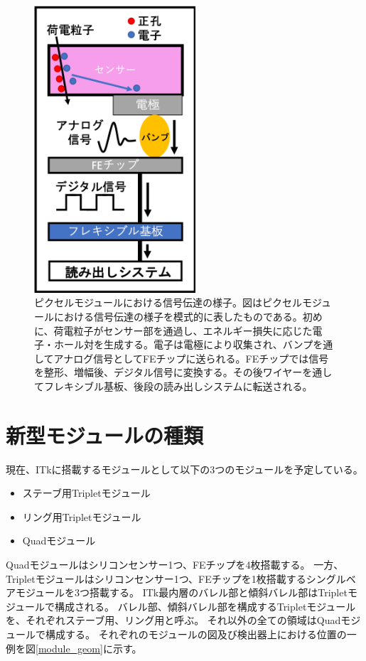 \begin{figure}[bpt]\centering
\includegraphics[width=6cm]{./module_electric_overview.png}
\caption[ピクセルモジュールにおける信号伝達の様子]{ピクセルモジュールにおける信号伝達の様子。図はピクセルモジュールにおける信号伝達の様子を模式的に表したものである。初めに、荷電粒子がセンサー部を通過し、エネルギー損失に応じた電子・ホール対を生成する。電子は電極により収集され、バンプを通してアナログ信号としてFEチップに送られる。FEチップでは信号を整形、増幅後、デジタル信号に変換する。その後ワイヤーを通してフレキシブル基板、後段の読み出しシステムに転送される。}
\label{module_electric_overview}
\end{figure}

\clearpage
\section{新型モジュールの種類}
現在、ITkに搭載するモジュールとして以下の3つのモジュールを予定している。
\begin{itemize}
  \item ステーブ用Tripletモジュール
  \item リング用Tripletモジュール
  \item Quadモジュール
\end{itemize}

Quadモジュールはシリコンセンサー1つ、FEチップを4枚搭載する。
一方、Tripletモジュールはシリコンセンサー1つ、FEチップを1枚搭載するシングルベアモジュールを3つ搭載する。
ITk最内層のバレル部と傾斜バレル部はTripletモジュールで構成される。
バレル部、傾斜バレル部を構成するTripletモジュールを、それぞれステーブ用、リング用と呼ぶ。
それ以外の全ての領域はQuadモジュールで構成する。
それぞれのモジュールの図及び検出器上における位置の一例を図\ref{module_geom}に示す。

